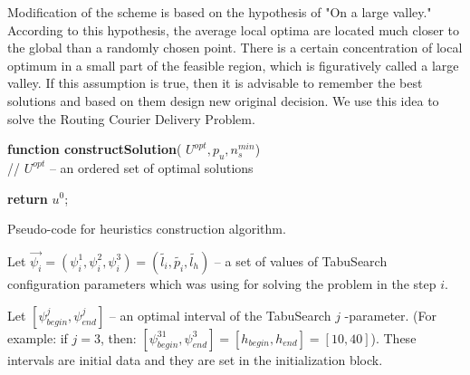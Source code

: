 \documentclass[]{TAACpaper}
\begin{document}
Modification of the scheme is based on the hypothesis of "On a large valley." According to this hypothesis, the average local optima are located much closer to the global than a randomly chosen point. There is a certain concentration of local optimum in a small part of the feasible region, which is figuratively called a large valley. If this assumption is true, then it is advisable to remember the best solutions and based on them design new original decision. We use this idea to solve the  Routing Courier Delivery Problem.

\begin{algorithm}[H]

	\textbf{function constructSolution}( $U^{opt}, p_u, n^{min}_s$) \\
	// $U^{opt}$ -- an ordered set of optimal solutions \\
	
	
	
	\textbf{return} $u^0$;
	
	\caption{Pseudo-code for heuristics construction algorithm.}
	\label{alg:constructSolution}
\end{algorithm}

Let $\vec{\psi_i} = (\psi^1_i,\psi^2_i,\psi^3_i) = (\tilde{l_i},\tilde{p_i},\tilde{l_h})$ -- a set of values of TabuSearch configuration parameters which was using for solving the problem in the step $i$.

Let $[\psi^j_{begin}, \psi^j_{end}]$ -- an optimal interval of the TabuSearch $j$ -parameter. (For example: if $j=3$, then: $[\psi^31_{begin}, \psi^3_{end}]= [h_{begin}, h_{end}] = [10, 40] $). These intervals are initial data and they are set in the initialization block. 
\end{document}
